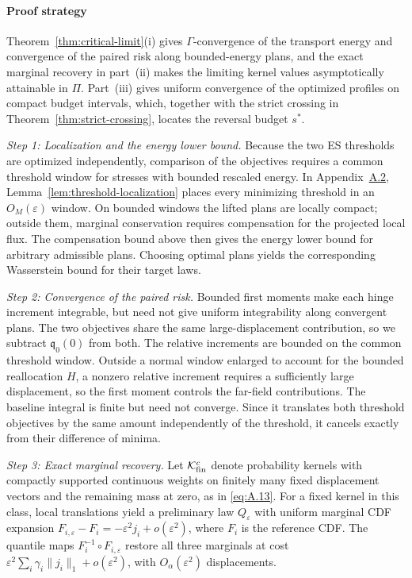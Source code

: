 \paragraph{Proof strategy} Theorem~\ref{thm:critical-limit}(i) gives \(\Gamma\)-convergence of the transport energy and convergence of the paired risk along bounded-energy plans, and the exact marginal recovery in part~(ii) makes the limiting kernel values asymptotically attainable in \(\Pi\). Part~(iii) gives uniform convergence of the optimized profiles on compact budget intervals, which, together with the strict crossing in Theorem~\ref{thm:strict-crossing}, locates the reversal budget \(s^*\).

\emph{Step 1: Localization and the energy lower bound.} Because the two ES thresholds are optimized independently, comparison of the objectives requires a common threshold window for stresses with bounded rescaled energy. In Appendix~\hyperref[proof:threshold-localization]{A.2}, Lemma~\ref{lem:threshold-localization} places every minimizing threshold in an \(O_M(\varepsilon)\) window. On bounded windows the lifted plans are locally compact; outside them, marginal conservation requires compensation for the projected local flux. The compensation bound above then gives the energy lower bound for arbitrary admissible plans. Choosing optimal plans yields the corresponding Wasserstein bound for their target laws.

\emph{Step 2: Convergence of the paired risk.} Bounded first moments make each hinge increment integrable, but need not give uniform integrability along convergent plans. The two objectives share the same large-displacement contribution, so we subtract \(\mathfrak q_0(0)\) from both. The relative increments are bounded on the common threshold window. Outside a normal window enlarged to account for the bounded reallocation \(H\), a nonzero relative increment requires a sufficiently large displacement, so the first moment controls the far-field contributions. The baseline integral is finite but need not converge. Since it translates both threshold objectives by the same amount independently of the threshold, it cancels exactly from their difference of minima.

\emph{Step 3: Exact marginal recovery.} Let \(\mathcal K_{\rm fin}^c\) denote probability kernels with compactly supported continuous weights on finitely many fixed displacement vectors and the remaining mass at zero, as in \eqref{eq:A.13}. For a fixed kernel in this class, local translations yield a preliminary law \(Q_\varepsilon\) with uniform marginal CDF expansion \(F_{i,\varepsilon}-F_i=-\varepsilon^2j_i+o(\varepsilon^2)\), where \(F_i\) is the reference CDF. The quantile maps \(F_i^{-1}\circ F_{i,\varepsilon}\) restore all three marginals at cost \(\varepsilon^2\sum_i\gamma_i\|j_i\|_1+o(\varepsilon^2)\), with \(O_\alpha(\varepsilon^2)\) displacements.

